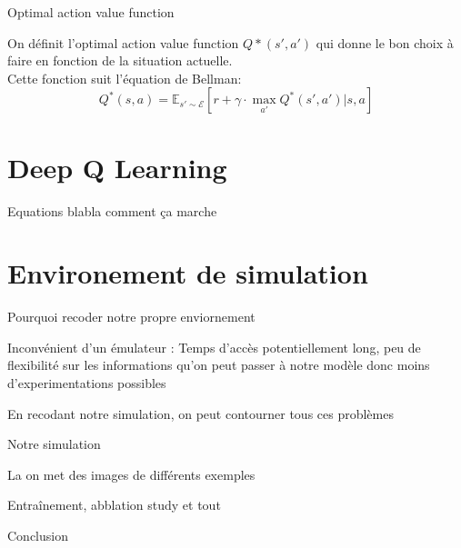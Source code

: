 \documentclass{beamer}
\begin{document}
	\begin{frame}{Optimal action value function}
		
		On définit l'optimal action value function $Q*(s', a')$ qui donne le bon choix à faire en fonction de la situation actuelle. \\
		Cette fonction suit l'équation de Bellman:
		$$Q^*(s, a) = \mathbb{E}_{s' \sim \mathcal{E}}[r + \gamma \cdot \max_{a'}Q^*(s', a') | s, a]$$
		
	\end{frame}
	
	\section{Deep Q Learning}
	
	\begin{frame}{Equations blabla comment ça marche}
		
	\end{frame}
	
	\section{Environement de simulation}
	
	\begin{frame}{Pourquoi recoder notre propre enviornement}
		
		Inconvénient d'un émulateur : Temps d'accès potentiellement long, peu de flexibilité sur les informations qu'on peut passer à notre modèle donc moins d'experimentations possibles
		
		En recodant notre simulation, on peut contourner tous ces problèmes 
		
	\end{frame}
	
	\begin{frame}{Notre simulation}
		
		La on met des images de différents exemples
		
	\end{frame}
	
	\begin{frame}{Entraînement, abblation study et tout}
	\end{frame}
	
	\begin{frame}{Conclusion}
		
		
		
	\end{frame}
	
\end{document}
